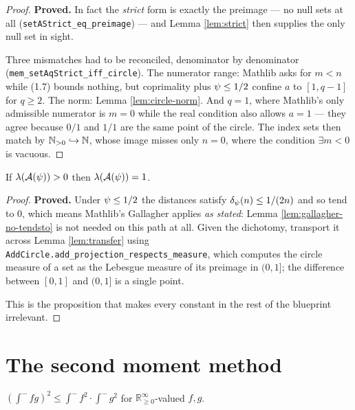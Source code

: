 \begin{proof}
  \leanok
  \textbf{Proved.} In fact the \emph{strict} form is exactly the preimage --- no null
  sets at all (\texttt{setAStrict\_eq\_preimage}) --- and Lemma \ref{lem:strict} then
  supplies the only null set in sight.

  Three mismatches had to be reconciled, denominator by denominator
  (\texttt{mem\_setAqStrict\_iff\_circle}). The numerator range: Mathlib asks for
  $m < n$ while (1.7) bounds nothing, but coprimality plus $\psi \le 1/2$ confine $a$ to
  $[1, q-1]$ for $q \geq 2$. The norm: Lemma \ref{lem:circle-norm}. And $q = 1$, where
  Mathlib's only admissible numerator is $m = 0$ while the real condition also allows
  $a = 1$ --- they agree because $0/1$ and $1/1$ are the same point of the circle. The
  index sets then match by $\mathbb{N}_{>0} \hookrightarrow \mathbb{N}$, whose image misses only $n = 0$,
  where the condition $\exists m < 0$ is vacuous.
\end{proof}

\begin{proposition}
  \label{prop:positive-suffices}
  \leanok
  If $\lambda(\mathcal{A}(\psi)) > 0$ then $\lambda(\mathcal{A}(\psi)) = 1$.
\end{proposition}

\begin{proof}
  \leanok
  \textbf{Proved.} Under $\psi \leq 1/2$ the distances satisfy $\delta_\psi(n) \leq 1/(2n)$
  and so tend to $0$, which means Mathlib's Gallagher applies \emph{as stated}: Lemma
  \ref{lem:gallagher-no-tendsto} is not needed on this path at all. Given the dichotomy,
  transport it across Lemma \ref{lem:transfer} using
  \texttt{AddCircle.add\_projection\_respects\_measure}, which computes the circle measure
  of a set as the Lebesgue measure of its preimage in $(0,1]$; the difference between
  $[0,1]$ and $(0,1]$ is a single point.

  This is the proposition that makes every constant in the rest of the blueprint
  irrelevant.
\end{proof}

\chapter{The second moment method}
\label{chap:secondmoment}

\begin{lemma}
  \label{lem:cauchy-schwarz}
  \leanok
  $\left(\int^- fg\right)^2 \leq \int^- f^2 \cdot \int^- g^2$ for
  $\mathbb{R}_{\geq 0}^{\infty}$-valued $f, g$.
\end{lemma}


